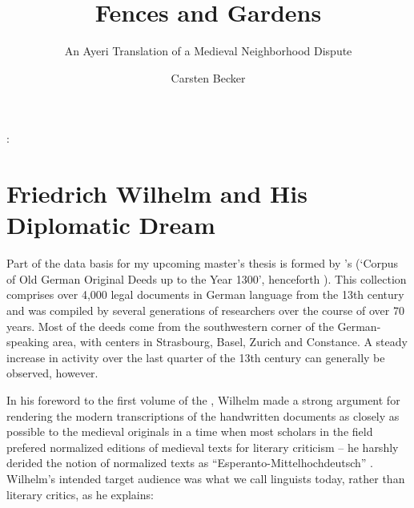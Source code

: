 \documentclass[12pt,paper=a4]{scrartcl}
\author{Carsten Becker}
\title{Fences and Gardens}
\subtitle{An Ayeri Translation of a Medieval Neighborhood Dispute}
\newenvironment{mytitle}{
    \hfill
    \begin{minipage}{0.667\textwidth}
	\vspace{\baselineskip}
	\begin{center}
	    \Large
	    \sffamily\bfseries
	    \makeatletter
}{
	    \makeatother
	\end{center}
	\vspace{1em}
    \end{minipage}
    \hfill
}
\begin{document}

\begin{mytitle}
    \@title: \@subtitle
\end{mytitle}

\section{Friedrich Wilhelm and His Diplomatic Dream}
Part of the data basis for my upcoming master's thesis is formed by \citeauthor{CAO}'s  (\enquote*{Corpus of Old German Original Deeds up to the Year 1300}, henceforth ). This collection comprises over 4,000 legal documents in German language from the 13th century and was compiled by several generations of researchers over the course of over 70 years. Most of the deeds come from the southwestern corner of the German-speaking area, with centers in Strasbourg, Basel, Zurich and Constance. A steady increase in activity over the last quarter of the 13th century can generally be observed, however.

In his foreword to the first volume of the , Wilhelm made a strong argument for rendering the modern transcriptions of the handwritten documents as closely as possible to the medieval originals in a time when most scholars in the field prefered normalized editions of medieval texts for literary criticism – he harshly derided the notion of normalized texts as \enquote{Esperanto-Mittelhochdeutsch} \autocite[see][VIII--IX]{CAO1}. Wilhelm's intended target audience was what we call linguists today, rather than literary critics, as he explains:
\end{document}
